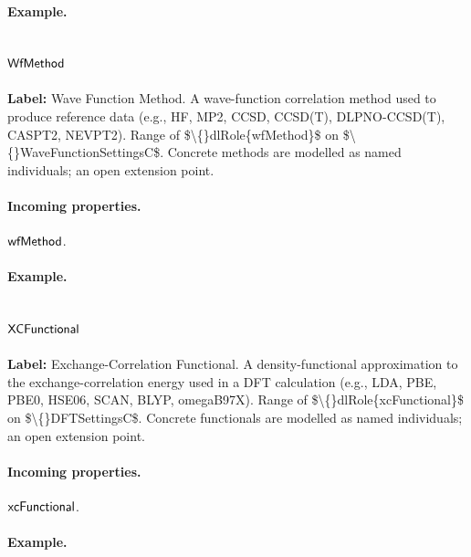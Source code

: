 \paragraph{Example.}

\subsection{$\mathsf{WfMethod}$}
\label{sec:term-WfMethod}

\textbf{Label:} Wave Function Method.
A wave-function correlation method used to produce reference data (e.g., HF, MP2, CCSD, CCSD(T), DLPNO-CCSD(T), CASPT2, NEVPT2). Range of \$\textbackslash\{\}dlRole\{wfMethod\}\$ on \$\textbackslash\{\}WaveFunctionSettingsC\$. Concrete methods are modelled as named individuals; an open extension point.

\paragraph{Incoming properties.} $\mathsf{wfMethod}$.

\paragraph{Example.}

\subsection{$\mathsf{XCFunctional}$}
\label{sec:term-XCFunctional}

\textbf{Label:} Exchange-Correlation Functional.
A density-functional approximation to the exchange-correlation energy used in a DFT calculation (e.g., LDA, PBE, PBE0, HSE06, SCAN, BLYP, omegaB97X). Range of \$\textbackslash\{\}dlRole\{xcFunctional\}\$ on \$\textbackslash\{\}DFTSettingsC\$. Concrete functionals are modelled as named individuals; an open extension point.

\paragraph{Incoming properties.} $\mathsf{xcFunctional}$.

\paragraph{Example.}


